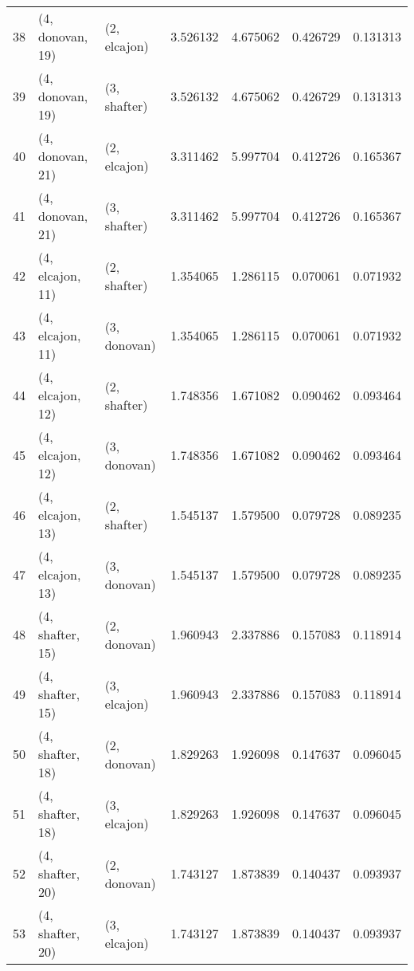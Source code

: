 \begin{tabular}{lllrrrr}
38 &  (4, donovan, 19) &     (2, elcajon) &  3.526132 &  4.675062 &   0.426729 &  0.131313 \\
39 &  (4, donovan, 19) &     (3, shafter) &  3.526132 &  4.675062 &   0.426729 &  0.131313 \\
40 &  (4, donovan, 21) &     (2, elcajon) &  3.311462 &  5.997704 &   0.412726 &  0.165367 \\
41 &  (4, donovan, 21) &     (3, shafter) &  3.311462 &  5.997704 &   0.412726 &  0.165367 \\
42 &  (4, elcajon, 11) &     (2, shafter) &  1.354065 &  1.286115 &   0.070061 &  0.071932 \\
43 &  (4, elcajon, 11) &     (3, donovan) &  1.354065 &  1.286115 &   0.070061 &  0.071932 \\
44 &  (4, elcajon, 12) &     (2, shafter) &  1.748356 &  1.671082 &   0.090462 &  0.093464 \\
45 &  (4, elcajon, 12) &     (3, donovan) &  1.748356 &  1.671082 &   0.090462 &  0.093464 \\
46 &  (4, elcajon, 13) &     (2, shafter) &  1.545137 &  1.579500 &   0.079728 &  0.089235 \\
47 &  (4, elcajon, 13) &     (3, donovan) &  1.545137 &  1.579500 &   0.079728 &  0.089235 \\
48 &  (4, shafter, 15) &     (2, donovan) &  1.960943 &  2.337886 &   0.157083 &  0.118914 \\
49 &  (4, shafter, 15) &     (3, elcajon) &  1.960943 &  2.337886 &   0.157083 &  0.118914 \\
50 &  (4, shafter, 18) &     (2, donovan) &  1.829263 &  1.926098 &   0.147637 &  0.096045 \\
51 &  (4, shafter, 18) &     (3, elcajon) &  1.829263 &  1.926098 &   0.147637 &  0.096045 \\
52 &  (4, shafter, 20) &     (2, donovan) &  1.743127 &  1.873839 &   0.140437 &  0.093937 \\
53 &  (4, shafter, 20) &     (3, elcajon) &  1.743127 &  1.873839 &   0.140437 &  0.093937 \\
\bottomrule
\end{tabular}
